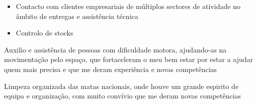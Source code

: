 


\begin{itemize}
	\item Contacto com clientes empresariais de múltiplos sectores de atividade no âmbito de entregas e assistência técnica
	\item Controlo de stocks
\end{itemize}

\smallskip

   



\smallskip


\divider




Auxilio e assistência de pessoas com dificuldade motora, ajudando-as na movimentação pelo espaço, que fortaceleram o meu bem estar por estar a ajudar quem mais precisa e que me deram experiência e novas competências 

\divider 



Limpeza organizada das matas nacionais, onde houve um grande espirito de equipa e organização, com muito convívio que me deram novas competências
